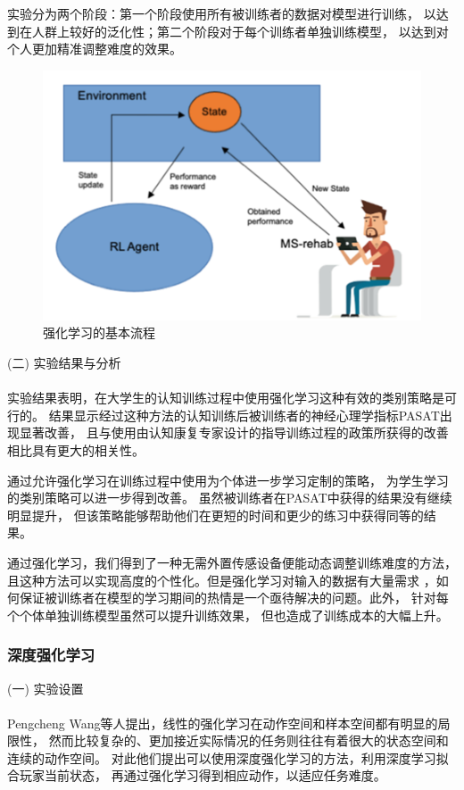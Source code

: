 \documentclass[12pt]{article}
\begin{document}
            实验分为两个阶段：第一个阶段使用所有被训练者的数据对模型进行训练，
            以达到在人群上较好的泛化性；第二个阶段对于每个训练者单独训练模型，
            以达到对个人更加精准调整难度的效果。
            \begin{figure}[H]
            	
            	\centering
            	\includegraphics[scale=0.7]{images/RL_stage.png}
            	\caption{强化学习的基本流程}
            	\label{fig:label}
            \end{figure}
            (二) 实验结果与分析\paragraph{}
            实验结果表明，在大学生的认知训练过程中使用强化学习这种有效的类别策略是可行的。
            结果显示经过这种方法的认知训练后被训练者的神经心理学指标PASAT出现显著改善，
            且与使用由认知康复专家设计的指导训练过程的政策所获得的改善相比具有更大的相关性。

            通过允许强化学习在训练过程中使用为个体进一步学习定制的策略，
            为学生学习的类别策略可以进一步得到改善。
            虽然被训练者在PASAT中获得的结果没有继续明显提升，
            但该策略能够帮助他们在更短的时间和更少的练习中获得同等的结果。

            通过强化学习，我们得到了一种无需外置传感设备便能动态调整训练难度的方法，
            且这种方法可以实现高度的个性化。但是强化学习对输入的数据有大量需求
            ，如何保证被训练者在模型的学习期间的热情是一个亟待解决的问题。此外，
            针对每个个体单独训练模型虽然可以提升训练效果，
            但也造成了训练成本的大幅上升。

            \subsubsection{深度强化学习}
            (一) 实验设置\paragraph{}
            Pengcheng Wang\cite{ref13}等人提出，线性的强化学习在动作空间和样本空间都有明显的局限性，
            然而比较复杂的、更加接近实际情况的任务则往往有着很大的状态空间和连续的动作空间。
            对此他们提出可以使用深度强化学习的方法，利用深度学习拟合玩家当前状态，
            再通过强化学习得到相应动作，以适应任务难度。
\end{document}
